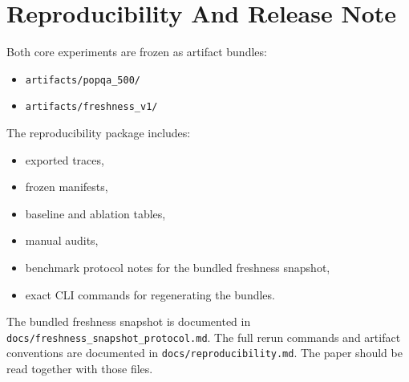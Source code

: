 \section{Reproducibility And Release Note}

Both core experiments are frozen as artifact bundles:
\begin{itemize}[leftmargin=1.5em]
\item \texttt{artifacts/popqa\_500/}
\item \texttt{artifacts/freshness\_v1/}
\end{itemize}

The reproducibility package includes:
\begin{itemize}[leftmargin=1.5em]
\item exported traces,
\item frozen manifests,
\item baseline and ablation tables,
\item manual audits,
\item benchmark protocol notes for the bundled freshness snapshot,
\item exact CLI commands for regenerating the bundles.
\end{itemize}

The bundled freshness snapshot is documented in \texttt{docs/freshness\_snapshot\_protocol.md}. The full rerun commands and artifact conventions are documented in \texttt{docs/reproducibility.md}. The paper should be read together with those files.
